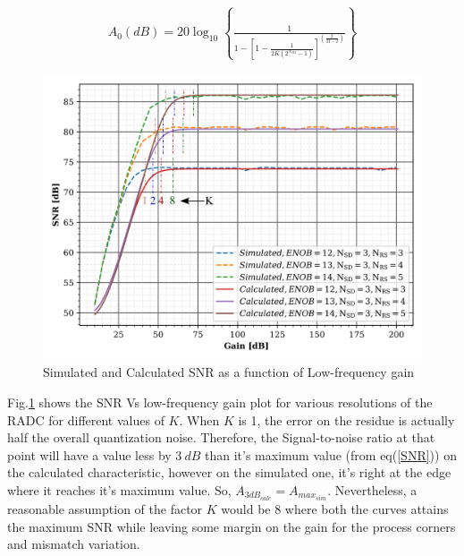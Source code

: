 \begin{align}\label{A1}
    A_0(dB)= 20\log_{10}\left\{\frac{1}{1-\left[1-\frac{1}{2K\left(2^{N_{RS}}-1\right)}\right]^{\left(\frac{2}{M-2}\right)}}\right\}
\end{align}


 \begin{figure}
    \centering
    \includegraphics[scale=.7]{Chap04/Figures/snr_vs_gain_calc1}
    \caption{Simulated and Calculated SNR as a function of Low-frequency gain}
    \label{fig:SNR_G_calc1}
\end{figure}

Fig.\ref{fig:SNR_G_calc1} shows the SNR Vs low-frequency gain plot for various resolutions of the RADC for different values of $K$. When $K$ is 1, the error on the residue is actually half the overall quantization noise. Therefore, the Signal-to-noise ratio at that point will have a value less by $3~dB$ than it's maximum value (from eq(\ref{SNR})) on the calculated characteristic, however on the simulated one, it's right at the edge where it reaches it's maximum value. So, $A_{3dB_{calc}} = A_{max_{sim}}$. Nevertheless, a reasonable assumption of the factor $K$ would be 8 where both the curves attains the maximum SNR while leaving some margin on the gain for the process corners and mismatch variation.

